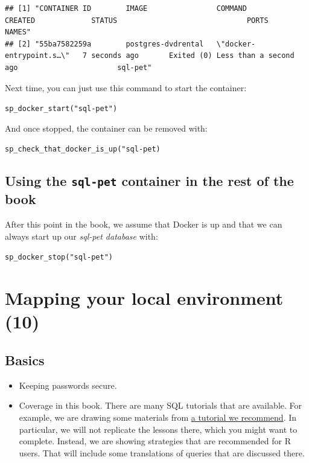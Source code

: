 \documentclass[]{book}
\providecommand{\tightlist}{%
  \setlength{\itemsep}{0pt}\setlength{\parskip}{0pt}}
\theoremstyle{definition}
\theoremstyle{definition}
\theoremstyle{definition}
\theoremstyle{remark}
\begin{document}
\begin{verbatim}
## [1] "CONTAINER ID        IMAGE                COMMAND                  CREATED             STATUS                              PORTS               NAMES"    
## [2] "55ba7582259a        postgres-dvdrental   \"docker-entrypoint.s…\"   7 seconds ago       Exited (0) Less than a second ago                       sql-pet"
\end{verbatim}

Next time, you can just use this command to start the container:

\texttt{sp\_docker\_start("sql-pet")}

And once stopped, the container can be removed with:

\texttt{sp\_check\_that\_docker\_is\_up("sql-pet)}

\hypertarget{using-the-sql-pet-container-in-the-rest-of-the-book}{%
\section{\texorpdfstring{Using the \texttt{sql-pet} container in the
rest of the
book}{Using the sql-pet container in the rest of the book}}\label{using-the-sql-pet-container-in-the-rest-of-the-book}}

After this point in the book, we assume that Docker is up and that we
can always start up our \emph{sql-pet database} with:

\texttt{sp\_docker\_stop("sql-pet")}

\hypertarget{mapping-your-local-environment-10}{%
\chapter{Mapping your local environment
(10)}\label{mapping-your-local-environment-10}}

\hypertarget{basics}{%
\section{Basics}\label{basics}}

\begin{itemize}
\tightlist
\item
  Keeping passwords secure.
\item
  Coverage in this book. There are many SQL tutorials that are
  available. For example, we are drawing some materials from
  \href{http://www.postgresqltutorial.com/postgresql-sample-database/}{a
  tutorial we recommend}. In particular, we will not replicate the
  lessons there, which you might want to complete. Instead, we are
  showing strategies that are recommended for R users. That will include
  some translations of queries that are discussed there.
\end{itemize}
\end{document}
